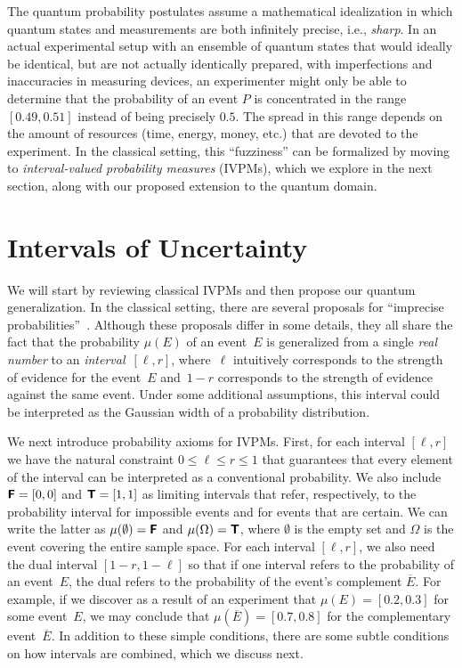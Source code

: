 \documentclass[english,reprint, aps, prl,superscriptaddress, showpacs,
showkeys, longbibliography, amsmath, amssymb, floatfix]{revtex4-1}
\theoremstyle{plain}
\theoremstyle{definition}
\newcommand{\interval}[1]{{\normalfont\textsf{\textbf{#1}}}}
\newcommand{\imposs}{\interval{F}}
\newcommand{\necess}{\interval{T}}
\begin{document}
The quantum probability postulates assume a mathematical idealization
in which quantum states and measurements are both infinitely
precise, i.e., {\it sharp}. 
In an actual experimental setup with an ensemble of quantum
states that would ideally be identical, but are not actually
identically prepared, with imperfections and inaccuracies in measuring
devices, an experimenter might only be able to determine that the
probability of an event $P$ is concentrated in the range $[0.49,0.51]$
instead of being precisely $0.5$. The spread in this range depends on
the amount of resources (time, energy, money, etc.)  that are devoted
to the experiment. In the classical setting, this ``fuzziness'' can be
formalized by moving to \emph{interval-valued probability measures}
(IVPMs), which we explore in the next section, along with our proposed
extension to the quantum domain.

\section{Intervals of Uncertainty}
\label{sec:Interval-Uncertainty}

We will start by reviewing classical IVPMs and then
propose our quantum generalization. In the classical setting, there
are several proposals for ``imprecise
probabilities''~\cite{Dempster1967,Shafer1976,GilboaSchmeidler1994,Marinacci1999,Weichselberger2000,JamisonLodwick2004,HuberRonchetti2009,Grabisch2016}.
Although these proposals differ in some details, they all share the
fact that the probability $\mu(E)$ of an event~$E$ is generalized from
a single \emph{real number} to an \emph{interval}~$[\ell,r]$,
where~$\ell$ intuitively corresponds to the strength of evidence for
the event~$E$ and~$1-r$ corresponds to the strength of evidence
against the same event. Under some additional assumptions, this
interval could be interpreted as the Gaussian width of a probability
distribution.

We next introduce probability axioms for IVPMs. First, for each
interval $[\ell,r]$ we have the natural constraint
$0 \leq \ell \leq r \leq 1$ that guarantees that every element of the
interval can be interpreted as a conventional probability. We also
include $\imposs=[0,0]$ and $\necess=[1,1]$ as limiting intervals that
refer, respectively, to the probability interval for impossible events and
for events that are certain. We can write the latter as
$\mu(\emptyset)=\imposs$ and $\mu(\Omega)=\necess$, where $\emptyset$
is the empty set and $\Omega$ is the event covering the entire sample
space.  For each interval $[\ell,r]$, we also need the dual interval
$[1-r,1-\ell]$ so that if one interval refers to the probability of an
event~$E$, the dual refers to the probability of the event's
complement $\overline{E}$.  For example, if we discover as a result of
an experiment that $\mu(E) = [0.2,0.3]$ for some event~$E$, we may
conclude that $\mu\left(\overline{E}\right) = [0.7,0.8]$ for the
complementary event~$\overline{E}$. In addition to these simple
conditions, there are some subtle conditions on how intervals are
combined, which we discuss next.
\end{document}
